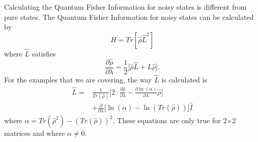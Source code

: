 \documentclass[twocolumn]{article}
\begin{document}
Calculating the Quantum Fisher Information for noisy states is different from pure states. The Quantum Fisher Information for noisy states can be calculated by
\begin{equation} \label{Eq: QFINSE}
H=Tr[\hat{\rho}\hat{L}^2]
\end{equation}
where $\hat{L}$ satisfies
\begin{equation}\label{Eq: QFINSLS}
\frac{\partial\hat{\rho}}{\partial\lambda}=\frac{1}{2}\big[\hat{\rho}\hat{L}+\hat{L}\hat{\rho}\big].
\end{equation}
For the examples that we are covering, the way $\hat{L}$ is calculated is
\begin{align} \label{Eq: NSLOE}
\hat{L}=&\frac{1}{Tr(\hat{\rho})}\Big[2\cdot\frac{\partial\hat{\rho}}{\partial\lambda}-\frac{\partial \ln(\alpha)}{\partial\lambda}\hat{\rho}\Big] \nonumber \\
&+\frac{\partial}{\partial\lambda}\Big[\ln(\alpha)-\ln(Tr(\hat{\rho}))\Big]\hat{I}
\end{align}
\cite{D. Collins} where $\alpha=Tr{(\hat{\rho}^2)}-(Tr(\hat{\rho}))^2$. These equations are only true for 2$\times$2 matrices and where $\alpha\neq 0$.
\end{document}
